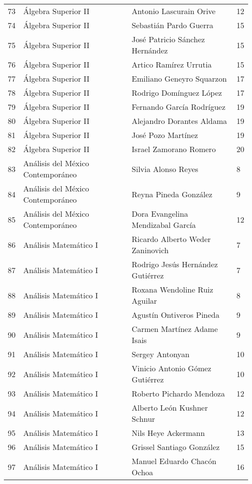 \begin{table}[ht]
\begin{tabular}{rlll}
  73 & Álgebra Superior II & Antonio Lascurain Orive & 12 \\ 
  74 & Álgebra Superior II & Sebastián Pardo Guerra & 15 \\ 
  75 & Álgebra Superior II & José Patricio Sánchez Hernández & 15 \\ 
  76 & Álgebra Superior II & Artico Ramírez Urrutia & 15 \\ 
  77 & Álgebra Superior II & Emiliano Geneyro Squarzon & 17 \\ 
  78 & Álgebra Superior II & Rodrigo Domínguez López & 17 \\ 
  79 & Álgebra Superior II & Fernando García Rodríguez & 19 \\ 
  80 & Álgebra Superior II & Alejandro Dorantes Aldama & 19 \\ 
  81 & Álgebra Superior II & José Pozo Martínez & 19 \\ 
  82 & Álgebra Superior II & Israel Zamorano Romero & 20 \\ 
  83 & Análisis del México Contemporáneo & Silvia Alonso Reyes & 8 \\ 
  84 & Análisis del México Contemporáneo & Reyna Pineda González & 9 \\ 
  85 & Análisis del México Contemporáneo & Dora Evangelina Mendizabal García & 12 \\ 
  86 & Análisis Matemático I & Ricardo Alberto Weder Zaninovich & 7 \\ 
  87 & Análisis Matemático I & Rodrigo Jesús Hernández Gutiérrez & 7 \\ 
  88 & Análisis Matemático I & Roxana Wendoline Ruiz Aguilar & 8 \\ 
  89 & Análisis Matemático I & Agustín Ontiveros Pineda & 9 \\ 
  90 & Análisis Matemático I & Carmen Martínez Adame Isais & 9 \\ 
  91 & Análisis Matemático I & Sergey Antonyan & 10 \\ 
  92 & Análisis Matemático I & Vinicio Antonio Gómez Gutiérrez & 10 \\ 
  93 & Análisis Matemático I & Roberto Pichardo Mendoza & 12 \\ 
  94 & Análisis Matemático I & Alberto León Kushner Schnur & 12 \\ 
  95 & Análisis Matemático I & Nils Heye Ackermann & 13 \\ 
  96 & Análisis Matemático I & Grissel Santiago González & 15 \\ 
  97 & Análisis Matemático I & Manuel Eduardo Chacón Ochoa & 16 \\ 

\end{tabular}
\end{table}
